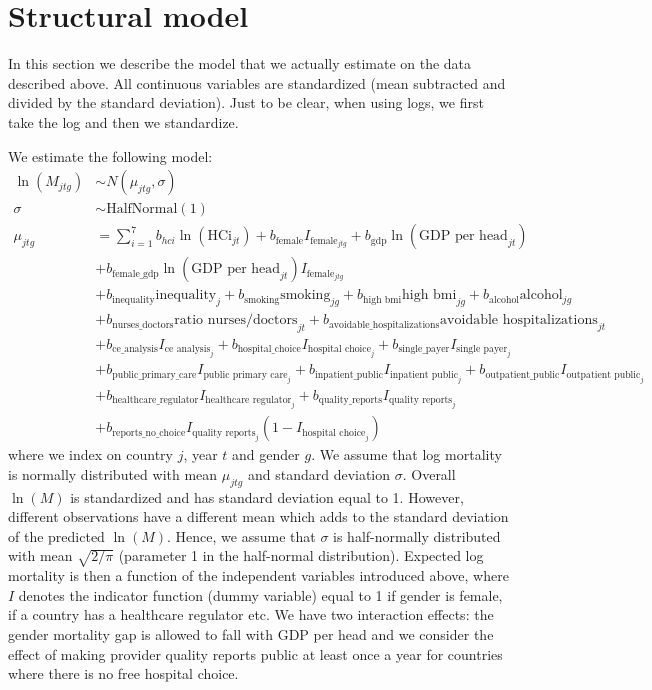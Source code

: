 \documentclass{article}
\begin{document}
\section{Structural model}
\label{sec:org4869315}

In this section we describe the model that we actually estimate on the data described above.  All continuous variables are standardized (mean subtracted and divided by the standard deviation). Just to be clear, when using logs, we first take the log and then we standardize.

We estimate the following model:
\begin{align*}
\ln(M_{jtg}) &\sim N(\mu_{jtg},\sigma) \\
\sigma & \sim\text{HalfNormal}(1) \\
\mu_{jtg} &= \sum_{i=1}^7 b_{hci} \ln(\text{HCi}_{jt}) + b_{\text{female}} I_{\text{female}_{jtg}} + b_{\text{gdp}} \ln(\text{GDP per head}_{jt}) \\
 & + b_{\text{female\_gdp}} \ln(\text{GDP per head}_{jt})  I_{\text{female}_{jtg}} \\
 & + b_{\text{inequality}} \text{inequality}_{j} + b_{\text{smoking}} \text{smoking}_{jg}+ b_{\text{high bmi}} \text{high bmi}_{jg}+ b_{\text{alcohol}} \text{alcohol}_{jg} \\
 & + b_{\text{nurses\_doctors}} \text{ratio nurses/doctors}_{jt} + b_{\text{avoidable\_hospitalizations}} \text{avoidable hospitalizations}_{jt} \\
 & + b_{\text{ce\_analysis}} I_{\text{ce analysis}_{j}} +  b_{\text{hospital\_choice}} I_{\text{hospital choice}_{j}} + b_{\text{single\_payer}} I_{\text{single payer}_{j}} \\
 & +  b_{\text{public\_primary\_care}} I_{\text{public primary care}_j} + b_{\text{inpatient\_public}} I_{\text{inpatient public}_{j}}+ b_{\text{outpatient\_public}} I_{\text{outpatient public}_j} \\
 & + b_{\text{healthcare\_regulator}} I_{\text{healthcare regulator}_j} + b_{\text{quality\_reports}} I_{\text{quality reports}_j} \\
 & + b_{\text{reports\_no\_choice}} I_{\text{quality reports}_j} (1-I_{\text{hospital choice}_j})
\end{align*}
where we index on country \(j\), year \(t\) and gender \(g\). We assume that log mortality is normally distributed with mean \(\mu_{jtg}\) and standard deviation \(\sigma\). Overall \(\ln(M)\) is standardized and has standard deviation equal to 1. However, different observations have a different mean which adds to the standard deviation of the predicted \(\ln(M)\). Hence, we assume that \(\sigma\) is half-normally distributed with mean \(\sqrt{2/\pi}\) (parameter 1 in the half-normal distribution). Expected log mortality is then a function of the independent variables introduced above, where \(I\) denotes the indicator function (dummy variable) equal to 1 if gender is female, if a country has a healthcare regulator etc. We have two interaction effects: the gender mortality gap is allowed to fall with GDP per head and we consider the effect of making provider quality reports public at least once a year for countries where there is no free hospital choice.
\end{document}
